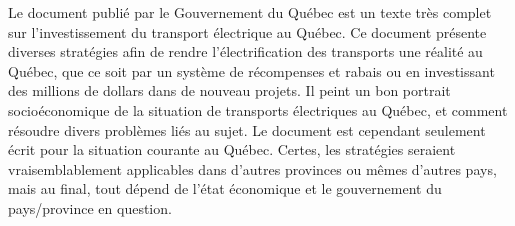 Le document  publié par le Gouvernement du Québec est un texte très complet sur l'investissement du transport électrique au Québec. Ce document présente diverses stratégies afin de rendre l'électrification des transports une réalité au Québec, que ce soit par un système de récompenses et rabais ou en investissant des millions de dollars dans de nouveau projets. Il peint un bon portrait socioéconomique de la situation de transports électriques au Québec, et comment résoudre divers problèmes liés au sujet. Le document est cependant seulement écrit pour la situation courante au Québec. Certes, les stratégies seraient vraisemblablement applicables dans d'autres provinces ou mêmes d'autres pays, mais au final, tout dépend de l'état économique et le gouvernement du pays/province en question.
